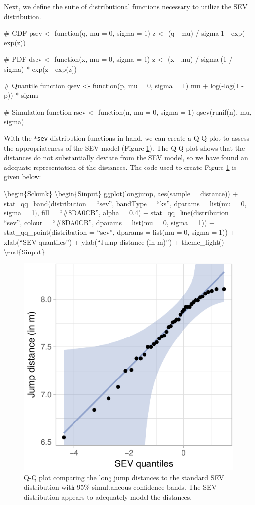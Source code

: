 Next, we define the suite of distributional functions necessary to
utilize the SEV distribution.

\begin{Schunk}
\begin{Sinput}
# CDF
psev <- function(q, mu = 0, sigma = 1) {
  z <- (q - mu) / sigma
  1 - exp(-exp(z))
}

# PDF
dsev <- function(x, mu = 0, sigma = 1) {
  z <- (x - mu) / sigma
  (1 / sigma) * exp(z - exp(z))
}

# Quantile function
qsev <- function(p, mu = 0, sigma = 1) {
  mu + log(-log(1 - p)) * sigma
}

# Simulation function
rsev <- function(n, mu = 0, sigma = 1) {
  qsev(runif(n), mu, sigma)
}
\end{Sinput}
\end{Schunk}

With the \texttt{*sev} distribution functions in hand, we can create a
Q-Q plot to assess the appropriateness of the SEV model (Figure
\ref{fig:sev-qq}). The Q-Q plot shows that the distances do not
substantially deviate from the SEV model, so we have found an adequate
representation of the distances. The code used to create Figure
\ref{fig:sev-qq} is given below:

\textbackslash{}begin\{Schunk\} \textbackslash{}begin\{Sinput\}
ggplot(longjump, aes(sample = distance)) + stat\_qq\_band(distribution =
``sev'', bandType = ``ks'', dparams = list(mu = 0, sigma = 1), fill =
``\#8DA0CB'', alpha = 0.4) + stat\_qq\_line(distribution = ``sev'',
colour = ``\#8DA0CB'', dparams = list(mu = 0, sigma = 1)) +
stat\_qq\_point(distribution = ``sev'', dparams = list(mu = 0, sigma =
1)) + xlab(``SEV quantiles'') + ylab(``Jump distance (in m)'') +
theme\_light() \textbackslash{}end\{Sinput\}

\begin{figure}

{\centering \includegraphics[width=0.45\linewidth]{loy-figures/sev-qq-1} 

}

\caption[Q-Q plot comparing the long jump distances to the standard SEV distribution with 95\% simultaneous confidence bands]{Q-Q plot comparing the long jump distances to the standard SEV distribution with 95\% simultaneous confidence bands. The SEV distribution appears to adequately model the distances.}\label{fig:sev-qq}
\end{figure}

